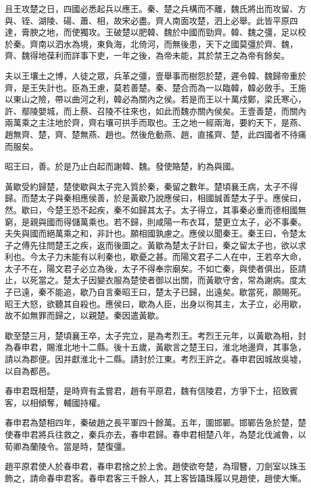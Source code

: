 且王攻楚之日，四國必悉起兵以應王。秦、楚之兵構而不離，魏氏將出而攻留、方與、铚、湖陵、碭、蕭、相，故宋必盡。齊人南面攻楚，泗上必舉。此皆平原四達，膏腴之地，而使獨攻。王破楚以肥韓、魏於中國而勁齊。韓、魏之彊，足以校於秦。齊南以泗水為境，東負海，北倚河，而無後患，天下之國莫彊於齊、魏，齊、魏得地葆利而詳事下吏，一年之後，為帝未能，其於禁王之為帝有餘矣。

夫以王壤土之博，人徒之眾，兵革之彊，壹舉事而樹怨於楚，遲令韓、魏歸帝重於齊，是王失計也。臣為王慮，莫若善楚。秦、楚合而為一以臨韓，韓必斂手。王施以東山之險，帶以曲河之利，韓必為關內之侯。若是而王以十萬戍鄭，梁氏寒心，許、鄢陵嬰城，而上蔡、召陵不往來也，如此而魏亦關內侯矣。王壹善楚，而關內兩萬乘之主注地於齊，齊右壤可拱手而取也。王之地一經兩海，要約天下，是燕、趙無齊、楚，齊、楚無燕、趙也。然後危動燕、趙，直搖齊、楚，此四國者不待痛而服矣。

昭王曰，善。於是乃止白起而謝韓、魏。發使賂楚，約為與國。

黃歇受約歸楚，楚使歇與太子完入質於秦，秦留之數年。楚頃襄王病，太子不得歸。而楚太子與秦相應侯善，於是黃歇乃說應侯曰，相國誠善楚太子乎。應侯曰，然。歇曰，今楚王恐不起疾，秦不如歸其太子。太子得立，其事秦必重而德相國無窮，是親與國而得儲萬乘也。若不歸，則咸陽一布衣耳，楚更立太子，必不事秦。夫失與國而絕萬乘之和，非計也。願相國孰慮之。應侯以聞秦王。秦王曰，令楚太子之傅先往問楚王之疾，返而後圖之。黃歇為楚太子計曰，秦之留太子也，欲以求利也。今太子力未能有以利秦也，歇憂之甚。而陽文君子二人在中，王若卒大命，太子不在，陽文君子必立為後，太子不得奉宗廟矣。不如亡秦，與使者俱出，臣請止，以死當之。楚太子因變衣服為楚使者御以出關，而黃歇守舍，常為謝病。度太子已遠，秦不能追，歇乃自言秦昭王曰，楚太子已歸，出遠矣。歇當死，願賜死。昭王大怒，欲聽其自殺也。應侯曰，歇為人臣，出身以徇其主，太子立，必用歇，故不如無罪而歸之，以親楚。秦因遣黃歇。

歇至楚三月，楚頃襄王卒，太子完立，是為考烈王。考烈王元年，以黃歇為相，封為春申君，賜淮北地十二縣。後十五歲，黃歇言之楚王曰，淮北地邊齊，其事急，請以為郡便。因并獻淮北十二縣。請封於江東。考烈王許之。春申君因城故吳墟，以自為都邑。

春申君既相楚，是時齊有孟嘗君，趙有平原君，魏有信陵君，方爭下士，招致賓客，以相傾奪，輔國持權。

春申君為楚相四年，秦破趙之長平軍四十餘萬。五年，圍邯鄲。邯鄲告急於楚，楚使春申君將兵往救之，秦兵亦去，春申君歸。春申君相楚八年，為楚北伐滅魯，以荀卿為蘭陵令。當是時，楚復彊。

趙平原君使人於春申君，春申君捨之於上舍。趙使欲夸楚，為瑁簪，刀劍室以珠玉飾之，請命春申君客。春申君客三千餘人，其上客皆躡珠履以見趙使，趙使大慚。

